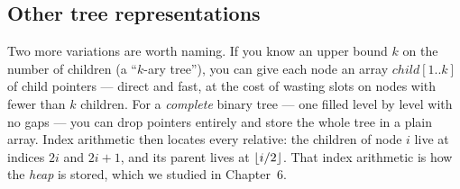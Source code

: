 \subsection{Other tree representations}

Two more variations are worth naming. If you know an upper bound $k$ on the number of children (a ``$k$-ary tree''), you can give each node an array $child[1..k]$ of child pointers --- direct and fast, at the cost of wasting slots on nodes with fewer than $k$ children. For a \emph{complete} binary tree --- one filled level by level with no gaps --- you can drop pointers entirely and store the whole tree in a plain array. Index arithmetic then locates every relative: the children of node $i$ live at indices $2i$ and $2i+1$, and its parent lives at $\lfloor i/2\rfloor$. That index arithmetic is how the \emph{heap} is stored, which we studied in Chapter~6.

